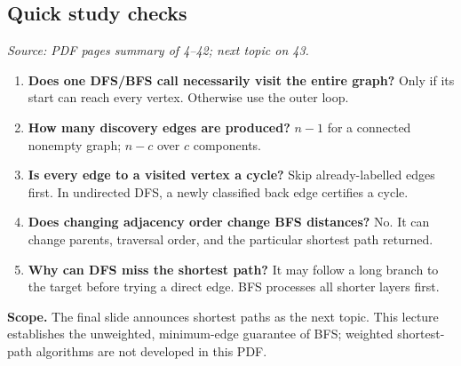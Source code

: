 \documentclass[11pt,letterpaper]{article}
\newcommand{\sourcepages}[1]{\textit{Source: PDF pages #1.}}
\begin{document}
\subsection{Quick study checks}
\sourcepages{summary of 4--42; next topic on 43}
\begin{enumerate}
    \item \textbf{Does one DFS/BFS call necessarily visit the entire graph?} Only if its start can reach every vertex. Otherwise use the outer loop.
    \item \textbf{How many discovery edges are produced?} $n-1$ for a connected nonempty graph; $n-c$ over $c$ components.
    \item \textbf{Is every edge to a visited vertex a cycle?} Skip already-labelled edges first. In undirected DFS, a newly classified back edge certifies a cycle.
    \item \textbf{Does changing adjacency order change BFS distances?} No. It can change parents, traversal order, and the particular shortest path returned.
    \item \textbf{Why can DFS miss the shortest path?} It may follow a long branch to the target before trying a direct edge. BFS processes all shorter layers first.
\end{enumerate}
\textbf{Scope.} The final slide announces shortest paths as the next topic. This lecture establishes the unweighted, minimum-edge guarantee of BFS; weighted shortest-path algorithms are not developed in this PDF.
\end{document}
